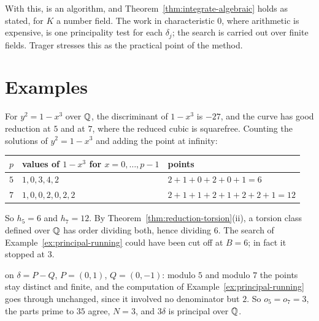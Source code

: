 With this,  is an algorithm, and
Theorem~\ref{thm:integrate-algebraic} holds as stated, for $K$ a number
field. The work in characteristic $0$,
where arithmetic is expensive, is one principality test for each $\delta_j$;
the search is carried out over finite fields. Trager stresses this as the
practical point of the method.

\section{Examples}\label{sec:fo-examples}

\begin{example}\label{ex:fo-running}
For $y^2 = 1 - x^3$ over $\mathbb{Q}$, the discriminant of $1 - x^3$ is $-27$, and the
curve has good reduction at $5$ and at $7$, where the reduced cubic is
squarefree. Counting the solutions of $y^2 = 1 - x^3$ and adding the point at
infinity:
\begin{center}
\begin{tabular}{@{}lll@{}}
\toprule
$p$ & values of $1 - x^3$ for $x = 0, \dots, p - 1$ & points \\
\midrule
$5$ & $1, 0, 3, 4, 2$ & $2 + 1 + 0 + 2 + 0 + 1 = 6$ \\
$7$ & $1, 0, 0, 2, 0, 2, 2$ & $2 + 1 + 1 + 2 + 1 + 2 + 2 + 1 = 12$ \\
\bottomrule
\end{tabular}
\end{center}
So $h_5 = 6$ and $h_7 = 12$. By Theorem~\ref{thm:reduction-torsion}(ii), a
torsion class defined over $\mathbb{Q}$ has order dividing both, hence dividing $6$.
The search of Example~\ref{ex:principal-running} could have been cut off at
$B = 6$; in fact it stopped at $3$.

 on $\delta = P - Q$, $P = (0, 1)$, $Q = (0, -1)$: modulo
$5$ and modulo $7$ the points stay distinct and finite, and the computation
of Example~\ref{ex:principal-running} goes through unchanged, since it
involved no denominator but $2$. So $o_5 = o_7 = 3$, the parts
prime to $35$ agree, $N = 3$, and $3\delta$ is principal over $\mathbb{Q}$.
\end{example}


